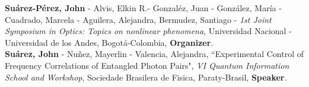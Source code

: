 \documentclass[10pt, a4paper]{article}
\newcommand{\years}[1]{\marginnote{\scriptsize #1}}
\begin{document}

\years{2018}\textbf{Suárez-Pérez, John} - Alvis, Elkin R.- Gonzaléz, Juan - González, María - Cuadrado, Marcela - Aguilera, Alejandra, Bermudez, Santiago - \emph{1st Joint Symposium in Optics: Topics on nonlinear phenomena}, Universidad Nacional - Universidad de los Andes, Bogotá-Colombia, \textbf{Organizer}.\\



\years{2017}\textbf{Suárez, John} - Nuñez, Mayerlin - Valencia, Alejandra, “Experimental Control of Frequency Correlations of Entangled Photon Pairs", \emph{VI Quantum Information School and Workshop}, Sociedade Brasilera de Fisica, Paraty-Brasil, \textbf{Speaker}.



\end{document}
